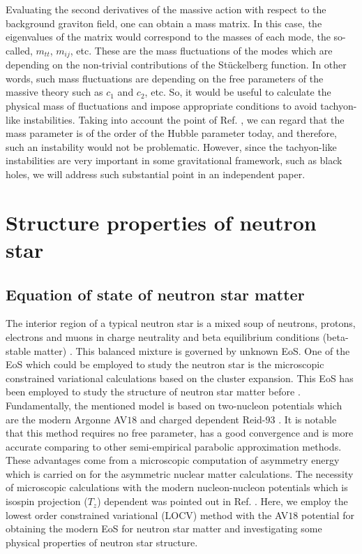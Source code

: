 \documentclass[aps]{revtex4}
\begin{document}
Evaluating the second derivatives of the massive action with
respect to the background graviton field, one can obtain a mass
matrix. In this case, the eigenvalues of the matrix would
correspond to the masses of each mode, the so-called, $m_{tt}$,
$m_{ij}$, etc. These are the mass fluctuations of the modes which
are depending on the non-trivial contributions of the
St\"{u}ckelberg function. In other words, such mass fluctuations
are depending on the free parameters of the massive theory such as
$c_{1}$ and $c_{2}$, etc. So, it would be useful to calculate the
physical mass of fluctuations and impose appropriate conditions to
avoid tachyon-like instabilities. Taking into account the point of
Ref. \cite{review}, we can regard that the mass parameter is of
the order of the Hubble parameter today, and therefore, such an
instability would not be problematic. However, since the
tachyon-like instabilities are very important in some
gravitational framework, such as black holes, we will address such
substantial point in an independent paper.

\section{Structure properties of neutron star \label{Structure}}

\subsection{Equation of state of neutron star matter}

The interior region of a typical neutron star is a mixed soup of neutrons,
protons, electrons and muons in charge neutrality and beta equilibrium
conditions (beta-stable matter) \cite{Shapiro}. This balanced mixture is
governed by unknown EoS. One of the EoS which could be employed to study the
neutron star is the microscopic constrained variational calculations based
on the cluster expansion. This EoS has been employed to study the structure
of neutron star matter before \cite{Bordbar,Hendi2015}. Fundamentally, the
mentioned model is based on two-nucleon potentials which are the modern
Argonne AV$18$ \cite{Wiringa} and charged dependent Reid-$93$ \cite{Stoks}.
It is notable that this method requires no free parameter, has a good
convergence and is more accurate comparing to other semi-empirical parabolic
approximation methods. These advantages come from a microscopic computation
of asymmetry energy which is carried on for the asymmetric nuclear matter
calculations. The necessity of microscopic calculations with the modern
nucleon-nucleon potentials which is isospin projection ($T_{z}$) dependent
was pointed out in Ref. \cite{Bordbar1998}. Here, we employ the lowest order
constrained variational (LOCV) method with the AV$18 $ potential \cite%
{Bordbar} for obtaining the modern EoS for neutron star matter and
investigating some physical properties of neutron star structure.
\end{document}
